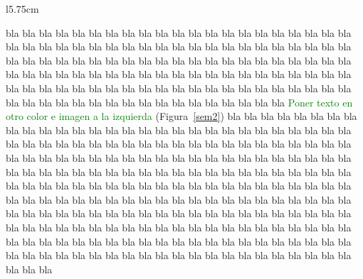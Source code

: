 \documentclass[12pt]{book}%
\theoremstyle{newstyle}%
\begin{document}
\begin{wrapfigure}{l}{5.75cm}
\begin{center}
\caption{Paralelogramo en el plano.}\label{sem2}
\end{center}
\end{wrapfigure}

bla bla bla bla bla bla bla bla bla bla bla bla bla bla bla bla bla bla bla bla bla bla bla bla bla bla bla bla bla bla bla bla bla bla bla bla bla bla bla bla bla bla bla bla bla bla bla bla bla bla bla bla bla bla bla bla bla bla bla bla bla bla bla bla bla bla bla bla bla bla bla bla bla bla bla bla bla bla bla bla bla bla bla bla bla bla bla bla bla bla bla bla bla bla bla bla bla bla bla bla bla bla bla bla bla bla bla bla bla bla bla bla bla bla bla bla bla bla bla bla bla bla  \textcolor{green}{Poner texto en otro color e imagen a la izquierda} (Figura~\ref{sem2}) bla bla bla bla bla bla bla bla bla bla bla bla bla bla bla bla bla bla bla bla bla bla bla bla bla bla bla bla bla bla bla bla bla bla bla bla bla bla bla bla bla bla bla bla bla bla bla bla bla bla bla bla bla bla bla bla bla bla bla bla bla bla bla bla bla bla bla bla bla bla bla bla bla bla bla bla bla bla bla bla bla bla bla bla bla bla bla bla bla bla bla bla bla bla bla bla bla bla bla bla bla bla bla bla bla bla bla bla bla bla bla bla bla bla bla bla bla bla bla bla bla bla bla bla bla bla bla bla bla bla bla bla bla bla bla bla bla bla bla bla bla bla bla bla bla bla bla bla bla bla bla bla bla bla bla bla bla bla bla bla bla bla bla bla bla bla bla bla bla bla bla bla bla bla bla bla bla bla bla bla bla bla bla bla bla bla bla bla bla bla bla bla bla bla bla bla bla bla bla bla bla bla bla bla bla bla bla bla bla bla bla bla bla bla bla bla bla bla bla bla bla
\end{document}
